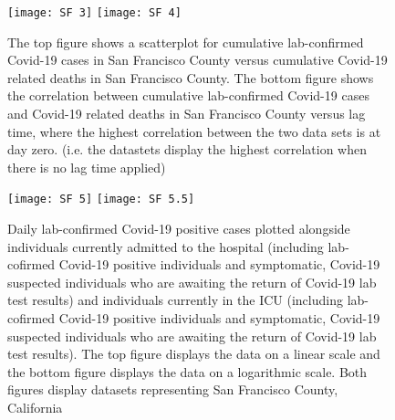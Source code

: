\documentclass{article}
\begin{document}
\FloatBarrier

\begin{figure}[!htbp]
	\begin{center}
		\texttt{[image: SF 3]}
		\vspace{1mm}
		\texttt{[image: SF 4]}
		\caption{ The top figure shows a scatterplot for cumulative lab-confirmed Covid-19 cases in San Francisco County versus cumulative Covid-19 related deaths in San Francisco County. The bottom figure shows the correlation between cumulative lab-confirmed Covid-19 cases and Covid-19 related deaths in San Francisco County versus lag time, where the highest correlation between the two data sets is at day zero. (i.e. the datastets display the highest correlation when there is no lag time applied)}
		\label{fig:17}
	\end{center}
\end{figure}

\FloatBarrier


\begin{figure}[!htbp]
	\begin{center}
		\texttt{[image: SF 5]}
		\vspace{1mm}
		\texttt{[image: SF 5.5]}
		\caption{ Daily lab-confirmed Covid-19 positive cases plotted alongside individuals currently admitted to the hospital (including lab-cofirmed Covid-19 positive individuals and symptomatic, Covid-19 suspected individuals who are awaiting the return of Covid-19 lab test results) and individuals currently in the ICU (including lab-cofirmed Covid-19 positive individuals and symptomatic, Covid-19 suspected individuals who are awaiting the return of Covid-19 lab test results). The top figure displays the data on a linear scale and the bottom figure displays the data on a logarithmic scale. Both figures display datasets representing San Francisco County, California}
		\label{fig:18}
	\end{center}
\end{figure}

\FloatBarrier
\end{document}
